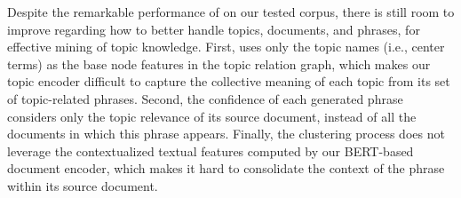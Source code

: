 Despite the remarkable performance of \proposed on our tested corpus, there is still room to improve regarding how to better handle topics, documents, and phrases, for effective mining of topic knowledge.
First, \proposed uses only the topic names (i.e., center terms) as the base node features in the topic relation graph, which makes our topic encoder difficult to capture the collective meaning of each topic from its set of topic-related phrases.
Second, the confidence of each generated phrase considers only the topic relevance of its source document, instead of all the documents in which this phrase appears.
Finally, the clustering process does not leverage the contextualized textual features computed by our BERT-based document encoder, which makes it hard to consolidate the context of the phrase within its source document.
